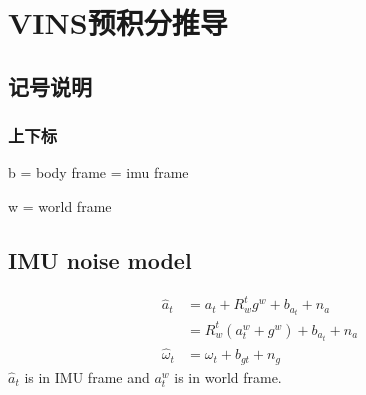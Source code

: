 \section{VINS预积分推导}
\subsection{记号说明}
\subsubsection{上下标}
\par b = body frame = imu frame
\par w = world frame

\subsection{IMU noise model}
\begin{equation}
	\begin{split}
		\hat{a}_t &= a_t + R_w^t g^w + b_{a_t} + n_a\\
		&= R_w^t (a_t^w+g^w)+b_{a_t}+n_{a}\\
		\hat{\omega}_t &= \omega_t+b_{gt}+n_{g}
	\end{split}
\end{equation}
$\hat{a}_t$ is in IMU frame and $a_t^w$ is in world frame.

